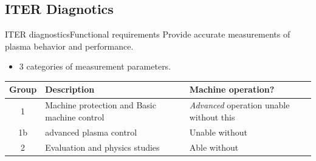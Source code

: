 \documentclass{beamer}
\begin{document}
\subsection{ITER Diagnotics}
\begin{frame}{ITER diagnostics}{Functional requirements}
		Provide accurate measurements of plasma behavior and performance.

  	\begin{itemize}
		\item  3 categories of measurement parameters.
	\end{itemize}
	\begin{tabular}{|c|p{4 cm}|p{4 cm}|}
		\hline
		\textbf {Group}& \textbf {Description} & \textbf {Machine operation? }\\\hline
		1 & Machine protection and Basic machine control & \textit{Advanced} operation unable  without  this\\\hline
		1b & advanced plasma control & Unable  without  \\\hline
		2& Evaluation and physics studies & Able  without  \\\hline
	\end{tabular}
\end{frame}
\end{document}

